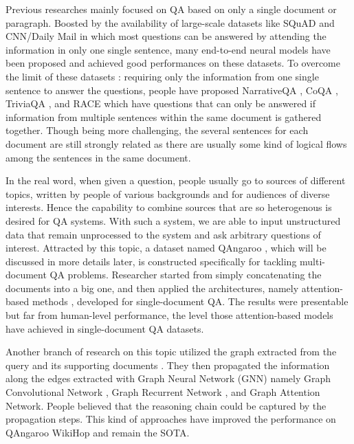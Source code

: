 \documentclass[12pt]{report}
\begin{document}
Previous researches mainly focused on QA based on only a single document or paragraph. Boosted by the
availability of large-scale datasets like SQuAD \cite{rajpurkar_squad:_2016} and CNN/Daily Mail \cite{hermann_teaching_2015}
in which most questions can be answered by attending the information in only one single sentence,
 many end-to-end neural models \cite{seo_bidirectional_2016, xiong_dynamic_2016, shen_reasonet:_2017}
have been proposed and achieved good performances on these datasets. To overcome the limit of these datasets
\cite{weissenborn_making_2017}: requiring only the information from one single sentence to answer the
questions, people have proposed NarrativeQA \cite{kocisky_narrativeqa_2018}, CoQA \cite{reddy_coqa:_2019},
TriviaQA \cite{joshi_triviaqa:_2017}, and RACE \cite{lai_race:_2017} which have questions that can only
be answered if information from multiple sentences within the same document is gathered together.
Though being more challenging, the several sentences for each document are still strongly related as there are usually some kind of logical flows among the sentences in the same document.

In the real word, when given a question, people usually go to sources of different topics, written by people of various backgrounds and for audiences of diverse interests. Hence the capability to combine sources that are so heterogenous is desired for QA systems. With such a system, we are able to input unstructured data that remain unprocessed to the system and ask arbitrary questions of interest. Attracted by this topic, a dataset named QAngaroo \cite{welbl_constructing_2018}, which will be discussed in more details later, is constructed specifically for tackling multi-document QA problems. Researcher started from simply
concatenating the documents into a big one, and then applied the architectures, namely attention-based methods \cite{seo_bidirectional_2016, weissenborn_making_2017}, developed for single-document QA.
The results were presentable but far from human-level performance, the level those attention-based models have achieved in single-document QA datasets.

Another branch of research on this topic utilized the graph extracted from the query and its supporting documents \cite{de_cao_question_2019, song_exploring_2018, tu_multi-hop_2019}. They then propagated the information along the edges  extracted with Graph Neural Network (GNN) \cite{zhou_graph_2018} namely Graph Convolutional Network \cite{kipf_semi-supervised_2016}, Graph Recurrent Network \cite{li_gated_2015, zhang_sentence-state_2018, song_graph--sequence_2018}, and Graph Attention Network\cite{velickovic_graph_2017}. People believed that the reasoning chain could be captured by the propagation steps. This kind of approaches have improved the performance on QAngaroo WikiHop and remain the SOTA.
\end{document}
